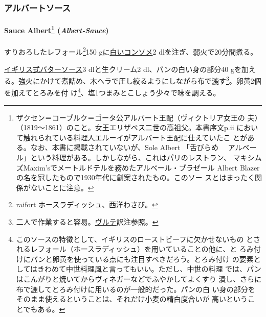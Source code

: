 \begin{recette}
{\subsubsection{アルバートソース}\label{ux30a2ux30ebux30d0ux30fcux30c8ux30bdux30fcux30b9}}

\hypertarget{albert-sauce}{%
\paragraph[Sauce Albert (\emph{Albert-Sauce})]{\texorpdfstring{Sauce
Albert\footnote{ザクセン＝コーブルク＝ゴータ公アルバート王配（ヴィクトリア女王の
  夫）（1819〜1861）のこと。女王エリザベス二世の高祖父。本書序文p.ii
  において触れられている料理人エルーイがアルバート王配に仕えていたこ
  とがある。なお、本書に掲載されていないが、Sole Albert 「舌びらめ　
  アルベール」という料理がある。しかしながら、これはパリのレストラン、
  マキシムズMaxim'sでメートルドテルを務めたアルベール・ブラゼール Albert
  Blazerの名を冠したもので1930年代に創案されたもの。このソー
  スとはまったく関係がないことに注意。}
(\emph{Albert-Sauce})}{Sauce Albert (Albert-Sauce)}}\label{albert-sauce}}

 
  
 

すりおろしたレフォール\footnote{raifort ホースラディッシュ、西洋わさび。}150
gに\protect\hyperlink{}{白いコンソメ}2 dlを注ぎ、弱火で20分間煮る。

\protect\hyperlink{sauce-au-beurre-a-l-anglaise}{イギリス式バターソース}3
dlと生クリーム2\undemi{} dl、パンの白い身の部分40
gを加える。強火にかけて煮詰め、木ヘラで圧し絞るようにしながら布で漉す\footnote{二人で作業すると容易。\protect\hyperlink{veloute}{ヴルテ}訳注参照。}。卵黄2個を加えてとろみを付
け\footnote{このソースの特徴として、イギリスのローストビーフに欠かせないもの
  とされるレフォール（ホースラディッシュ）を用いていることの他に、と
  ろみ付けにパンと卵黄を使っている点にも注目すべきだろう。とろみ付け
  の要素としてはきわめて中世料理風と言ってもいい。ただし、中世の料理
  では、パンはこんがりと焼いてからヴィネガーなどでふやかしてよくすり
  潰し、さらに布で漉してとろみ付けに用いるのが一般的だった。パンの白
  い身の部分をそのまま使えるということは、それだけ小麦の精白度合いが
  高いということでもある。}、塩1つまみとこしょう少々で味を調える。


\end{recette}
